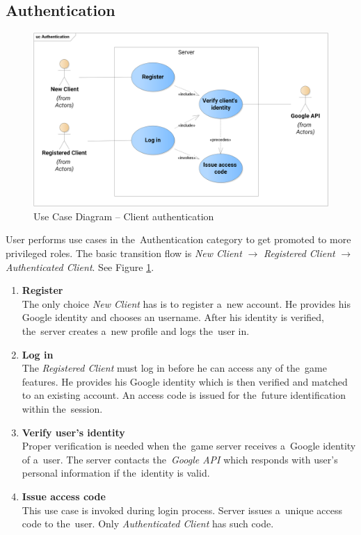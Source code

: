 	\subsection{Authentication}	
	\begin{figure}[h]	
		\includegraphics[width=\textwidth]{figures/UC_Authentication}
		\centering			
		\caption{Use Case Diagram -- Client authentication}
		\label{fig:ucauth}
	\end{figure}
	\noindent  User performs use cases in the~Authentication category to get promoted to more privileged roles. The basic transition flow is \textit{New Client} $\rightarrow$ \textit{Registered Client} $\rightarrow$ \textit{Authenticated Client}. See Figure \ref{fig:ucauth}.
	
	\begin{enumerate}
		\item \textbf{Register} \\
		The only choice \textit{New Client} has is to register a~new account. He provides his Google identity and chooses an username. After his identity is verified, the~server creates a~new profile and logs the~user in.
		
		\item \textbf{Log in} \\
		The \textit{Registered Client} must log in before he can access any of the~game features. He provides his Google identity which is then verified and matched to an existing account. An access code is issued for the~future identification within the~session.		
		
		\item \textbf{Verify user's identity} \\
		Proper verification is needed when the~game server receives a~Google identity of a~user. The server contacts the~\textit{Google API} which responds with user's personal information if the~identity is valid.
		
		\item \textbf{Issue access code} \\ 
		This use case is invoked during login process. Server issues a~unique access code to the~user. Only \textit{Authenticated Client} has such code.
	\end{enumerate}
	
